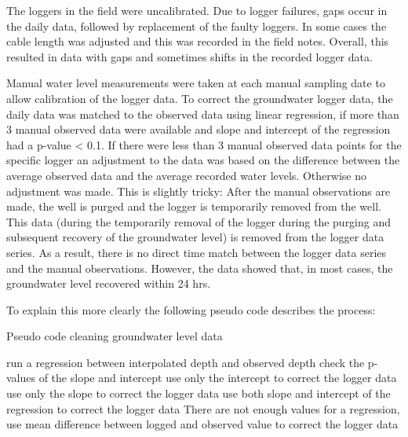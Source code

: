 \documentclass[, manuscript]{copernicus}
\begin{document}
The loggers in the field were uncalibrated. Due to logger failures, gaps
occur in the daily data, followed by replacement of the faulty loggers.
In some cases the cable length was adjusted and this was recorded in the
field notes. Overall, this resulted in data with gaps and sometimes
shifts in the recorded logger data.

Manual water level measurements were taken at each manual sampling date
to allow calibration of the logger data. To correct the groundwater
logger data, the daily data was matched to the observed data using
linear regression, if more than 3 manual observed data were available
and slope and intercept of the regression had a p-value \textless{} 0.1.
If there were less than 3 manual observed data points for the specific
logger an adjustment to the data was based on the difference between the
average observed data and the average recorded water levels. Otherwise
no adjustment was made. This is slightly tricky: After the manual
observations are made, the well is purged and the logger is temporarily
removed from the well. This data (during the temporarily removal of the
logger during the purging and subsequent recovery of the groundwater
level) is removed from the logger data series. As a result, there is no
direct time match between the logger data series and the manual
observations. However, the data showed that, in most cases, the
groundwater level recovered within 24 hrs.

To explain this more clearly the following pseudo code describes the
process:

\begin{algorithm}
\caption{Pseudo code cleaning groundwater level data}
\label{a1}
\begin{algorithmic}
        \STATE run a regression between interpolated depth and observed depth  
        \STATE check the p-values of the slope and intercept
                \STATE  use only the intercept to correct the logger data
        \ELSE
                        \STATE use only the slope to correct the logger data
                \ELSE
                       \STATE use both slope and intercept of the regression to correct the logger data
                \ENDIF
        \ENDIF
\ELSE
        \STATE There are not enough values for a regression, use mean difference between logged and observed value to correct the logger data
\ENDIF
\end{algorithmic}
\end{algorithm}
\end{document}
